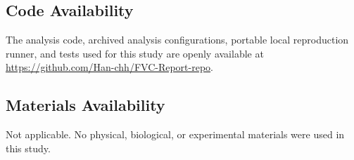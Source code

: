 \subsection*{Code Availability}
The analysis code, archived analysis configurations, portable local reproduction runner, and tests used for this study are openly available at \url{https://github.com/Han-chh/FVC-Report-repo}.

\subsection*{Materials Availability}
Not applicable. No physical, biological, or experimental materials were used in this study.
